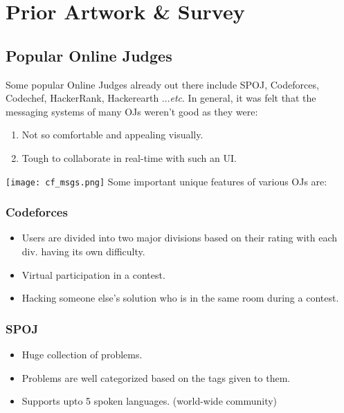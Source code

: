 \documentclass[hidelinks, a4paper,12pt, titlepage]{article}
\begin{document}
\section{Prior Artwork \& Survey}
\subsection{Popular Online Judges}
Some popular Online Judges already out there include SPOJ, Codeforces, Codechef, HackerRank, Hackerearth ...\emph{etc}.
In general, it was felt that the messaging systems of many OJs weren't good as they were:
\begin{enumerate}
\item Not so comfortable and appealing visually.
\item Tough to collaborate in real-time with such an UI.
\end{enumerate}
\texttt{[image: cf\_msgs.png]}
\newpage
Some important unique features of various OJs are:
\subsubsection{Codeforces}
\begin{itemize}
\item Users are divided into two major divisions based on their rating with each div. having its own difficulty.
\item Virtual participation in a contest.
\item Hacking someone else’s solution who is in the same room during a contest.
\end{itemize}
\subsubsection{SPOJ}
\begin{itemize}
\item Huge collection of problems.
\item Problems are well categorized  based on the tags given to them.
\item Supports upto 5 spoken languages. (world-wide community)
\end{itemize}
\end{document}
